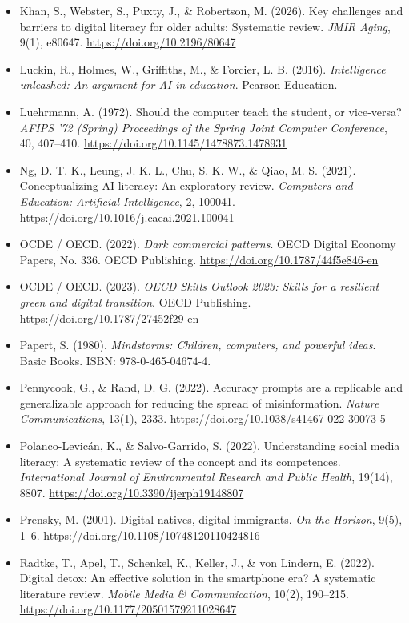 \begin{itemize}[leftmargin=1.5em, label={}, itemsep=0.22ex, parsep=0pt]
    \item Khan, S., Webster, S., Puxty, J., \& Robertson, M. (2026). Key challenges and barriers to digital literacy for older adults: Systematic review. \textit{JMIR Aging}, 9(1), e80647. \url{https://doi.org/10.2196/80647}
    \item Luckin, R., Holmes, W., Griffiths, M., \& Forcier, L. B. (2016). \textit{Intelligence unleashed: An argument for AI in education}. Pearson Education.
    \item Luehrmann, A. (1972). Should the computer teach the student, or vice-versa? \textit{AFIPS '72 (Spring) Proceedings of the Spring Joint Computer Conference}, 40, 407--410. \url{https://doi.org/10.1145/1478873.1478931}
    \item Ng, D. T. K., Leung, J. K. L., Chu, S. K. W., \& Qiao, M. S. (2021). Conceptualizing AI literacy: An exploratory review. \textit{Computers and Education: Artificial Intelligence}, 2, 100041. \url{https://doi.org/10.1016/j.caeai.2021.100041}
    \item OCDE / OECD. (2022). \textit{Dark commercial patterns}. OECD Digital Economy Papers, No. 336. OECD Publishing. \url{https://doi.org/10.1787/44f5e846-en}
    \item OCDE / OECD. (2023). \textit{OECD Skills Outlook 2023: Skills for a resilient green and digital transition}. OECD Publishing. \url{https://doi.org/10.1787/27452f29-en}
    \item Papert, S. (1980). \textit{Mindstorms: Children, computers, and powerful ideas}. Basic Books. ISBN: 978-0-465-04674-4.
    \item Pennycook, G., \& Rand, D. G. (2022). Accuracy prompts are a replicable and generalizable approach for reducing the spread of misinformation. \textit{Nature Communications}, 13(1), 2333. \url{https://doi.org/10.1038/s41467-022-30073-5}
    \item Polanco-Levicán, K., \& Salvo-Garrido, S. (2022). Understanding social media literacy: A systematic review of the concept and its competences. \textit{International Journal of Environmental Research and Public Health}, 19(14), 8807. \url{https://doi.org/10.3390/ijerph19148807}
    \item Prensky, M. (2001). Digital natives, digital immigrants. \textit{On the Horizon}, 9(5), 1--6. \url{https://doi.org/10.1108/10748120110424816}
    \item Radtke, T., Apel, T., Schenkel, K., Keller, J., \& von Lindern, E. (2022). Digital detox: An effective solution in the smartphone era? A systematic literature review. \textit{Mobile Media \& Communication}, 10(2), 190--215. \url{https://doi.org/10.1177/20501579211028647}

\end{itemize}
